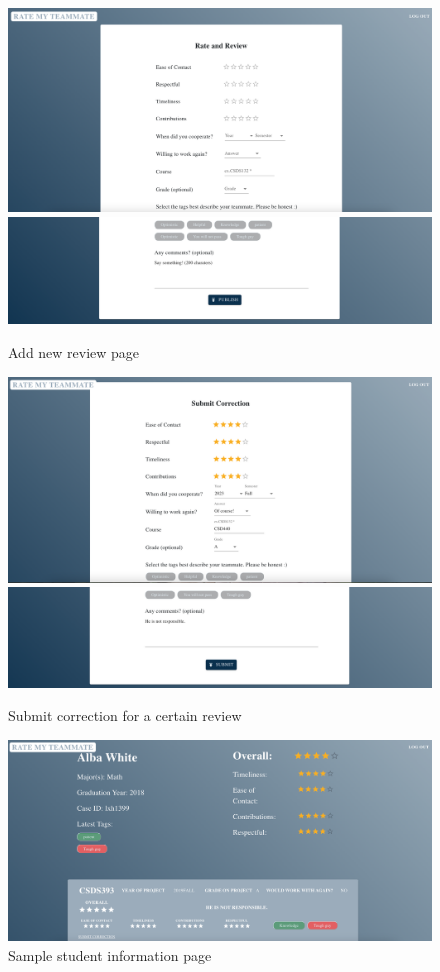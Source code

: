 \documentclass[12pt]{article}
\begin{document}
\begin{figure}[h]
    \centering
    \includegraphics[scale=0.2]{review-up.png}
    \centering
    \includegraphics[scale=0.2]{review-down.png}
    \caption{Add new review page}
    \label{fig:review}
\end{figure}

\begin{figure}[h]
    \centering
    \includegraphics[scale=0.2]{correction-up.png}
    \centering
    \includegraphics[scale=0.2]{correction-down.png}
    \caption{Submit correction for a certain review}
    \label{fig:correction}
\end{figure}

\begin{figure}[h]
    \centering
    \includegraphics[scale=0.3]{student.png}
    \caption{Sample student information page}
    \label{fig:profile}
\end{figure}
\end{document}
